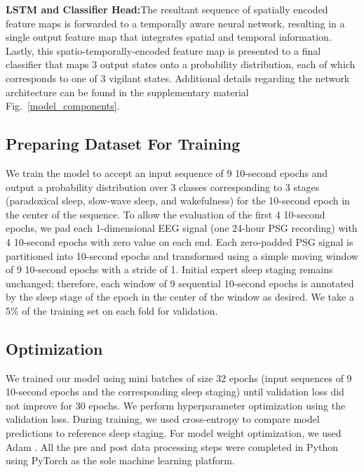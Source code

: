 \documentclass[pdflatex,sn-mathphys-num]{sn-jnl}%
\theoremstyle{thmstyleone}%
\theoremstyle{thmstyletwo}%
\theoremstyle{thmstylethree}%
\begin{document}
\noindent \textbf{LSTM and Classifier Head:}\quad The resultant sequence of spatially encoded feature maps is forwarded to a temporally aware neural network, resulting in a single output feature map that integrates spatial and temporal information. Lastly, this spatio-temporally-encoded feature map is presented to a final classifier that maps 3 output states onto a probability distribution, each of which corresponds to one of 3 vigilant states. Additional details regarding the network architecture can be found in the supplementary material Fig.~\ref{model_components}.

\subsection*{Preparing Dataset For Training}
We train the model to accept an input sequence of 9 10-second epochs and output a probability distribution over 3 classes corresponding to 3 stages (paradoxical sleep, slow-wave sleep, and wakefulness) for the 10-second epoch in the center of the sequence. To allow the evaluation of the first 4 10-second epochs, we pad each 1-dimensional EEG signal (one 24-hour PSG recording) with 4 10-second epochs with zero value on each end. Each zero-padded PSG signal is partitioned into 10-second epochs and transformed using a simple moving window of 9 10-second epochs with a stride of 1. Initial expert sleep staging remains unchanged; therefore, each window of 9 sequential 10-second epochs is annotated by the sleep stage of the epoch in the center of the window as desired. We take a 5\% of the training set on each fold for validation.

\subsection*{Optimization}
We trained our model using mini batches of size 32 epochs (input sequences of 9 10-second epochs and the corresponding sleep staging) until validation loss did not improve for 30 epochs. We perform hyperparameter optimization using the validation loss. During training, we used cross-entropy \cite{kullback_information_1951} to compare model predictions to reference sleep staging. For model weight optimization, we used Adam \cite{kingma_adam_2017}. All the pre and post data processing steps were completed in Python using PyTorch as the sole machine learning platform.
\end{document}
